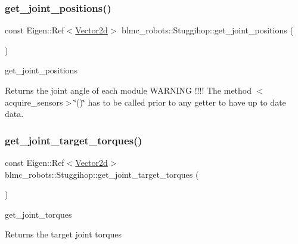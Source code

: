 \subsubsection{\texorpdfstring{get\+\_\+joint\+\_\+positions()}{get\_joint\_positions()}}
{\footnotesize\ttfamily const Eigen\+::\+Ref$<$\hyperlink{common__header_8hpp_acb6916bc8c9fe9d98c484fd4cc201447}{Vector2d}$>$ blmc\+\_\+robots\+::\+Stuggihop\+::get\+\_\+joint\+\_\+positions (\begin{DoxyParamCaption}{ }\end{DoxyParamCaption})\hspace{0.3cm}{\ttfamily [inline]}}



get\+\_\+joint\+\_\+positions 

\begin{DoxyReturn}{Returns}
the joint angle of each module W\+A\+R\+N\+I\+NG !!!! The method $<$acquire\+\_\+sensors$>$\char`\"{}()\char`\"{} has to be called prior to any getter to have up to date data. 
\end{DoxyReturn}
\mbox{\label{classblmc__robots_1_1Stuggihop_a2cad739e379d40ac6ccc50091ed3d456}} 
\subsubsection{\texorpdfstring{get\+\_\+joint\+\_\+target\+\_\+torques()}{get\_joint\_target\_torques()}}
{\footnotesize\ttfamily const Eigen\+::\+Ref$<$\hyperlink{common__header_8hpp_acb6916bc8c9fe9d98c484fd4cc201447}{Vector2d}$>$ blmc\+\_\+robots\+::\+Stuggihop\+::get\+\_\+joint\+\_\+target\+\_\+torques (\begin{DoxyParamCaption}{ }\end{DoxyParamCaption})\hspace{0.3cm}{\ttfamily [inline]}}



get\+\_\+joint\+\_\+torques 

\begin{DoxyReturn}{Returns}
the target joint torques 
\end{DoxyReturn}
\mbox{\label{classblmc__robots_1_1Stuggihop_a977ef0340cc0cbf164f9ba492736ca18}} 
